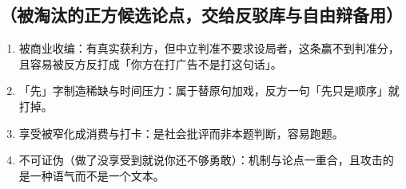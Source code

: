 \documentclass[prep,both]{debate}
\begin{document}
\subsection{（被淘汰的正方候选论点，交给反驳库与自由辩备用）}
\begin{enumerate}[leftmargin=1.8em]
\item 被商业收编：有真实获利方，但中立判准不要求设局者，这条赢不到判准分，且容易被反方反打成「你方在打广告不是打这句话」。
\item 「先」字制造稀缺与时间压力：属于替原句加戏，反方一句「先只是顺序」就打掉。
\item 享受被窄化成消费与打卡：是社会批评而非本题判断，容易跑题。
\item 不可证伪（做了没享受到就说你还不够勇敢）：机制与论点一重合，且攻击的是一种语气而不是一个文本。
\end{enumerate}
\end{document}
